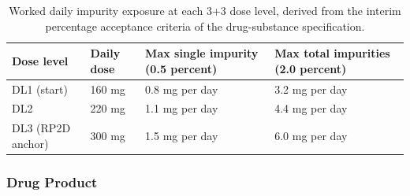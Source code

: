 \begin{table}[t]
\centering
\caption{Worked daily impurity exposure at each 3+3 dose level, derived from the
interim percentage acceptance criteria of the drug-substance specification.}
\label{tab:cmc-impurity-exposure}
\begin{tabularx}{\textwidth}{L{2.6cm} C{2.2cm} C{3.4cm} Y}
\toprule
\textbf{Dose level} & \textbf{Daily dose} & \textbf{Max single impurity (0.5 percent)} & \textbf{Max total impurities (2.0 percent)} \\
\midrule
DL1 (start) & 160 mg & 0.8 mg per day & 3.2 mg per day \\
DL2 & 220 mg & 1.1 mg per day & 4.4 mg per day \\
DL3 (RP2D anchor) & 300 mg & 1.5 mg per day & 6.0 mg per day \\
\bottomrule
\end{tabularx}
\end{table}

\subsubsection{Drug Product}

